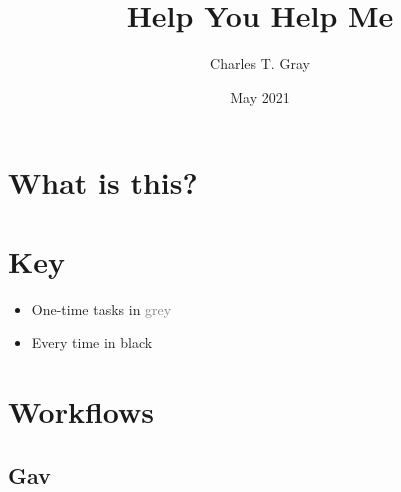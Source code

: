 \documentclass{article}
\title{Help You Help Me}
\author{Charles T. Gray}
\date{May 2021}
\begin{document}
\maketitle

\tableofcontents

\section{What is this?}



\section{Key}

\begin{itemize}
    \item One-time tasks in \textcolor{grey}{grey}
    \item Every time in black
\end{itemize}

\section{Workflows}

\subsection{Gav}
\end{document}
